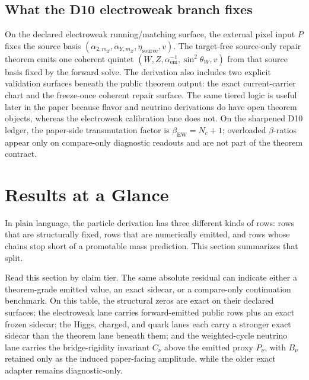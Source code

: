 \documentclass[11pt]{article}
\begin{document}
\subsection{What the D10 electroweak branch fixes}

On the declared electroweak running/matching surface, the external pixel input \(P\) fixes the
source basis
\((\alpha_{2,m_Z},\alpha_{Y,m_Z},\eta_{\mathrm{source}},v)\). The target-free
source-only repair theorem emits one coherent quintet
\((W,Z,\alpha_{\mathrm{em}}^{-1},\sin^2\theta_W,v)\) from that source basis fixed by the forward
solve. The
derivation also includes two explicit validation surfaces beneath the public theorem output: the
exact current-carrier chart and the freeze-once coherent repair surface. The same tiered logic is
useful later in the paper because flavor and neutrino derivations do have open theorem objects,
whereas the electroweak calibration lane does not.
On the sharpened D10 ledger, the paper-side transmutation factor is \(\beta_{\mathrm{EW}}=N_c+1\); overloaded \(\beta\)-ratios appear only on compare-only diagnostic readouts and are not part of the theorem contract.

\section{Results at a Glance}

In plain language, the particle derivation has three different kinds of rows: rows that are
structurally fixed, rows that are numerically emitted, and rows whose chains stop short of a promotable mass prediction. This section summarizes that split.

Read this section by claim tier. The same absolute residual can indicate either a theorem-grade emitted value, an exact sidecar, or a compare-only continuation benchmark. On this table, the structural zeros are exact on their declared surfaces; the electroweak lane carries forward-emitted public rows plus an exact frozen sidecar; the Higgs, charged, and quark lanes each carry a stronger exact sidecar than the theorem lane beneath them; and the weighted-cycle neutrino lane carries the bridge-rigidity invariant \(C_\nu\) above the emitted proxy \(P_\nu\), with \(B_\nu\) retained only as the induced paper-facing amplitude, while the older exact adapter remains diagnostic-only.
\end{document}
